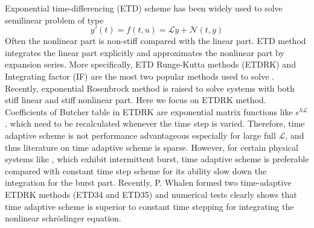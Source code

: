 Exponential time-differencing (ETD) scheme has been widely used to solve semilinear
problem of type
\begin{equation}
  \label{eq:sl}
  y'(t) = f(t, u) = \mathcal{L} y + \mathcal{N}(t, y)
\end{equation}
Often the nonlinear part is non-stiff compared with the linear part.
ETD method integrates the linear part explicitly and approximates the nonlinear part
by expansion series. More specifically,
ETD Runge-Kutta methods (ETDRK) and
Integrating factor (IF) are the most two
popular methods used to solve . Recently, exponential Rosenbrock
method
is raised to solve systems with both stiff linear and stiff nonlinear part.
Here we focus on ETDRK method. Coefficients of Butcher table
in ETDRK are exponential matrix
functions like $e^{h\mathcal{L}}$, which need to be recalculated whenever
the time step is varied. Therefore, time adaptive scheme is not performance
advantageous especially for large full $\mathcal{L}$, and thus literature
on time adaptive scheme is sparse. However, for certain physical systems like
\cGLe, which exhibit intermittent burst, time adaptive scheme is
preferable compared with constant time step scheme for its ability slow down
the integration for the burst part. Recently, P. Whalen \etal{} formed
two time-adaptive ETDRK methods (ETD34 and ETD35) and numerical tests clearly shows
that time adaptive scheme is superior to constant time stepping for integrating the
nonlinear schr\"{o}dinger equation.

